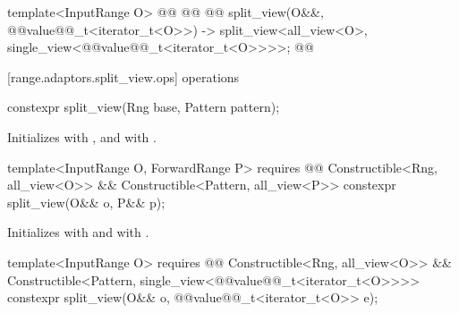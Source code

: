 \begin{codeblock}
{  template<InputRange O>
    @@
      @@
      @@
  split_view(O&&, @@value@@_t<iterator_t<O>>)
    -> split_view<all_view<O>, single_view<@@value@@_t<iterator_t<O>>>>;
}@\oldtxt{\}}@
\end{codeblock}

[range.adaptors.split_view.ops]{ operations}

%
\begin{itemdecl}
constexpr split_view(Rng base, Pattern pattern);
\end{itemdecl}

\begin{itemdescr}
\pnum
\effects Initializes  with , and
  with .
\end{itemdescr}

%
\begin{itemdecl}
template<InputRange O, ForwardRange P>
  requires @@
    Constructible<Rng, all_view<O>> &&
    Constructible<Pattern, all_view<P>>
constexpr split_view(O&& o, P&& p);
\end{itemdecl}

\begin{itemdescr}
\pnum
\effects
{\color{newclr}
Initializes  with  and
 with .
} %

\end{itemdescr}

%
\begin{itemdecl}
template<InputRange O>
  requires @@
    Constructible<Rng, all_view<O>> &&
    Constructible<Pattern, single_view<@@value@@_t<iterator_t<O>>>>
constexpr split_view(O&& o, @@value@@_t<iterator_t<O>> e);
\end{itemdecl}

